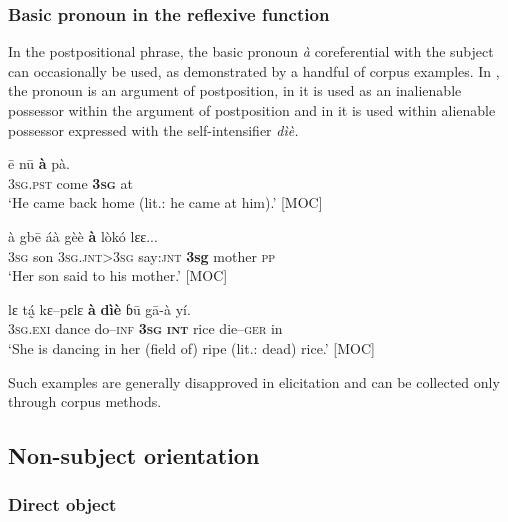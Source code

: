 \documentclass[output=paper]{langscibook}
\begin{document}
 \subsubsection{Basic pronoun in the reflexive function}
\label{sec:Kachaturyan:5.2.2}

In the postpositional phrase, the basic pronoun \textit{à} coreferential with the subject can occasionally be used, as demonstrated by a handful of corpus examples. In , the pronoun is an argument of postposition, in  it is used as an inalienable possessor within the argument of postposition and in  it is used within alienable possessor expressed with the self-intensifier \textit{dìè.} 

\ea
    \label{ex:Kachaturyan:28} 
 \gll ē  nū  \textbf{à}  pà.  \\
     3\textsc{sg}.\textsc{pst}  come  \textbf{3\textsc{sg}}  at\\
\glt ‘He came back home (lit.: he came at him).’ [MOC]
\z

\ea
    \label{ex:Kachaturyan:29} 
 \gll à  gbē  áà  gèè  \textbf{à}  lòkó  lɛɛ...\\
     3\textsc{sg}  son  \textsc{3sg.jnt>3sg}  say:\textsc{jnt}\textbf{  \textbf{3sg}}  mother \textsc{pp}\\
\glt ‘Her son said to his mother.’ [MOC]
\z

\ea
    \label{ex:Kachaturyan:30} 
 \gll lɛ  tá̰  kɛ–pɛlɛ  \textbf{à}  \textbf{dìè}  ɓū  gā-à  yí.\\
     3\textsc{sg}.\textsc{exi}  dance    do–\textsc{inf}  \textbf{3\textsc{sg}}  \textbf{\textsc{int}}  rice  die–\textsc{ger}  in\\
\glt ‘She is dancing in her (field of) ripe (lit.: dead) rice.’ [MOC]
\z

Such examples are generally disapproved in elicitation and can be collected only through corpus methods.


 
 \subsection{Non-subject orientation}\label{sec:Kachaturyan:5.3}

 \subsubsection{Direct object}\label{sec:Kachaturyan:5.3.1}
\end{document}
